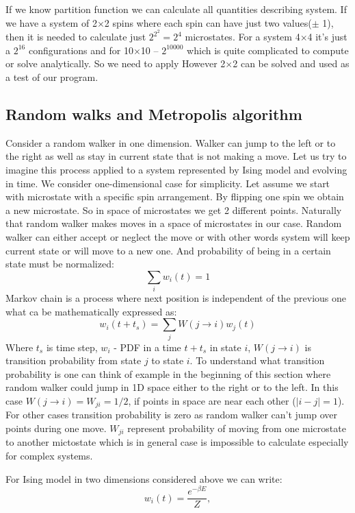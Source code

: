 \documentclass[10pt]{article}
\begin{document}
If we know partition function we can calculate all quantities describing system. If we have a system of 2$\times$2 spins where each spin can have just two values($\pm$ 1), then it is needed to calculate just $2^{2^{2}} = 2^4$ microstates. For a system 4$\times$4 it's just a $2^{16}$ configurations and for 10$\times$10 -- $2^{10000}$ which is quite complicated to compute or solve analytically. So we need to apply
However 2$\times$2 can be solved and used as a test of our program.



\subsection{Random walks and Metropolis algorithm}
Consider a random walker in one dimension. Walker can jump to the left or to the right as well as stay in current state that is not making a move. Let us try to imagine this process applied to a system represented by Ising model and evolving in time. We consider one-dimensional case for simplicity.
Let assume we start with microstate with a specific spin arrangement. By flipping one spin we obtain a new microstate. So in space of microstates we get 2 different points. Naturally that random walker makes moves in a space of microstates in our case.
Random walker can either accept or neglect the move or with other words system will keep
current state or will move to a new one. And probability of being in a certain state must be normalized:
\[
\sum_{i} {w_i(t)} = 1
\]
Markov chain is a process where next position is independent of the previous one what ca be mathematically expressed as:
\[
w_i(t+t_s)=\sum_{j} {W(j\rightarrow i)w_j(t)}
\]
Where $t_s$ is time step, $w_i$ - PDF in a time $t+t_s$ in state $i$, $W(j\rightarrow i)$ is transition probability from state $j$ to state $i$. To understand what transition probability is one can think of example in the beginning of this section where random walker could jump in 1D space either to the right or to the left. In this case
$W(j\rightarrow i)=W_{ji}=1/2$, if points in space are near each other ($|i-j|=1$). For other cases transition probability is zero as random walker can't jump over points during one move.
$W_{ji}$ represent probability of moving from one microstate to another mictostate which is in general case is impossible to calculate especially for complex systems.


For Ising model in two dimensions considered above we can write:
\[
w_i(t) = \frac{e^{-\beta E}}{Z},
\]
\end{document}
